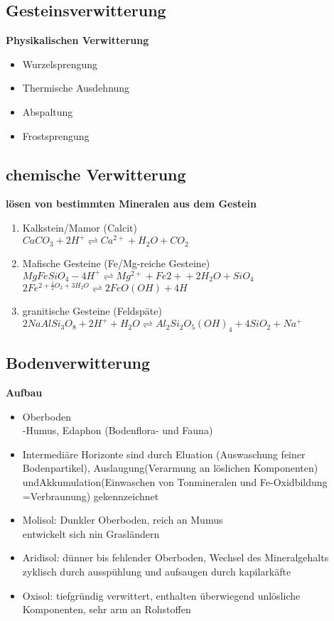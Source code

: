 \documentclass[a4,12pt]{scrreprt}
\begin{document}
\subsection{Gesteinsverwitterung}
\textbf{Physikalischen Verwitterung}
\begin{itemize}
\item Wurzelsprengung
\item Thermische Ausdehnung
\item Abspaltung
\item Frostsprengung
\end{itemize}

\subsection{chemische Verwitterung}

\textbf{lösen von bestimmten Mineralen aus dem Gestein}\\

\begin{enumerate}
\item Kalkstein/Mamor (Calcit)\\
$CaCO_3 + 2H^+ \rightleftharpoons Ca^{2+}+H_2O+CO_2$
\item Mafische Gesteine (Fe/Mg-reiche Gesteine)
$MgFeSiO_4-4H^+\rightleftharpoons	 Mg^{2+}+Fe{2+}+2H_2O+SiO_4$\\
$2Fe^{2+\frac{1}{2}O_2+3H_2O}\rightleftharpoons 2FeO(OH)+4H$
\item granitische Gesteine (Feldspäte)\\
$2NaAlSi_3O_8+2H^++H_2O\rightleftharpoons Al_2Si_2O_5(OH)_4+4SiO_2+Na^+$
\end{enumerate}

\subsection{Bodenverwitterung}
\textbf{Aufbau}

\begin{itemize}
\item Oberboden\\
-Humus, Edaphon (Bodenflora- und Fauna)
\item Intermediäre Horizonte sind durch Eluation (Auswaschung feiner Bodenpartikel), Auslaugung(Verarmung an löslichen Komponenten) undAkkumulation(Einwaschen von Tonmineralen und Fe-Oxidbildung =Verbraunung) gekennzeichnet
\end{itemize}

\begin{itemize}
\item Molisol: Dunkler Oberboden, reich an Mumus\\
entwickelt sich nin Grasländern\\
\item Aridisol: dünner bis fehlender Oberboden, Wechsel des Mineralgehalts zyklisch durch ausspühlung und aufsaugen durch kapilarkäfte\\
\item Oxisol: tiefgründig verwittert, enthalten überwiegend unlösliche Komponenten, sehr arm an Rohstoffen\\
\end{itemize}
\end{document}
